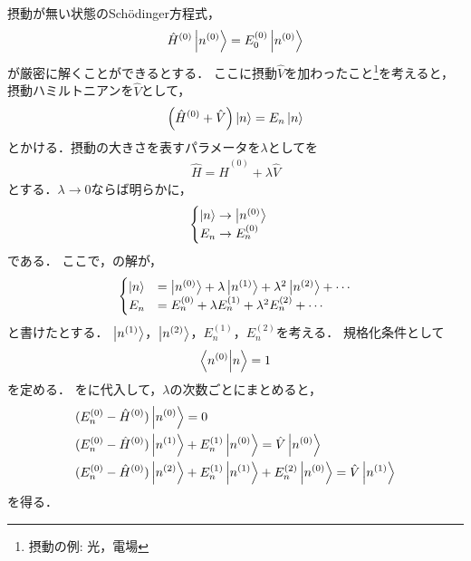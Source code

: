 \documentclass{report}
\begin{document}
  摂動が無い状態のSch\"odinger方程式，
  \begin{equation}
    \hat{H}^{(0)}\ket{n^{(0)}}=E_0^{(0)}\ket{n^{(0)}}
  \end{equation}
  が厳密に解くことができるとする．
  ここに摂動$\hat{V}$を加わったこと\footnote{摂動の例: 光，電場}を考えると，摂動ハミルトニアンを$\hat{V}$として，
  \begin{equation}
    \qty(\hat{H}^{(0)} + \hat{V})\ket{n} = E_n\ket{n}\label{perturbation-origin}
  \end{equation}
  とかける．摂動の大きさを表すパラメータを$\lambda$としてを
  \begin{align}
    \hat{H} = \hat{H}^{(0)} + \lambda\hat{V}\label{perturbation-using-lambda}
  \end{align}
  とする．$\lambda\to 0$ならば明らかに，
  \begin{equation}
    \begin{cases}
      \ket{n}\to\ket{n^{(0)}}\\
      E_n\to E_n^{(0)}
    \end{cases}
  \end{equation}
  である．
  ここで，の解が，%
  \begin{equation}
    \begin{cases}
      \ket{n} &= \ket{n^{(0)}} + \lambda\ket{n^{(1)}} + \lambda^2\ket{n^{(2)}} + \cdots \label{n-en-expantion} \\
      E_n &= E_n^{(0)} + \lambda E_n^{(1)} + \lambda^2 E_n^{(2)} + \cdots 
    \end{cases}
  \end{equation}
  と書けたとする．
  $\ket{n^{(1)}}$，$\ket{n^{(2)}}$，$E_n^{(1)}$，$E_n^{(2)}$を考える．
  規格化条件として
  \begin{equation}
    \braket{n^{(0)}}{n} = 1
  \end{equation}
  を定める．
  をに代入して，$\lambda$の次数ごとにまとめると，
  \begin{align}
    &(E_n^{(0)} - \hat{H}^{(0)})\ket{n^{(0)}} = 0 \label{0-order} \\ 
    &(E_n^{(0)} - \hat{H}^{(0)})\ket{n^{(1)}} + E_n^{(1)}\ket{n^{(0)}} = \hat{V}\ket{n^{(0)}} \label{1st-perturbation} \\
    &(E_n^{(0)} - \hat{H}^{(0)})\ket{n^{(2)}} + E_n^{(1)}\ket{n^{(1)}} + E_n^{(2)}\ket{n^{(0)}} = \hat{V}\ket{n^{(1)}} \label{2nd-perturbation}\\
  \end{align}
  を得る．
\end{document}
